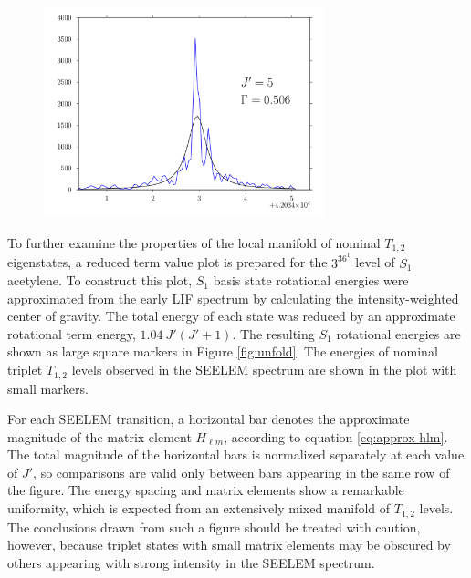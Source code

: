 \documentclass[12pt]{mitthesis}
\begin{document}
\begin{figure}
  \includegraphics[width=3.2in]{3361-q5-seelemfit}
\end{figure}


To further examine the properties of the local manifold of nominal
$T_{1,2}$ eigenstates, a reduced term value plot is prepared for the
$3^36^1$  level of $S_1$ acetylene.  To construct this plot,
$S_1$ basis state rotational energies were approximated
from the early LIF spectrum by calculating the intensity-weighted
center of gravity.  The total energy of each state was reduced by an
approximate rotational term energy, $1.04 \: J'(J'+1)$.  The resulting
$S_1$ rotational energies are shown as large square markers in Figure
\ref{fig:unfold}.  The energies of nominal triplet $T_{1,2}$ levels observed in the
SEELEM spectrum are shown in the plot with small markers.  

For each SEELEM transition, a horizontal bar denotes the approximate
magnitude of the matrix element $H_{\ell m}$, according to equation
\ref{eq:approx-hlm}.  The total magnitude of the horizontal bars is
normalized separately at each value of $J'$, so comparisons are valid
only between bars appearing in the same row of the figure.  The energy
spacing and matrix elements show a remarkable uniformity, which is
expected from an extensively mixed manifold of $T_{1,2}$ levels.  The
conclusions drawn from such a figure should be treated with caution,
however, because triplet states with small matrix elements may be
obscured by others appearing with strong intensity in the SEELEM
spectrum.  

\end{document}
